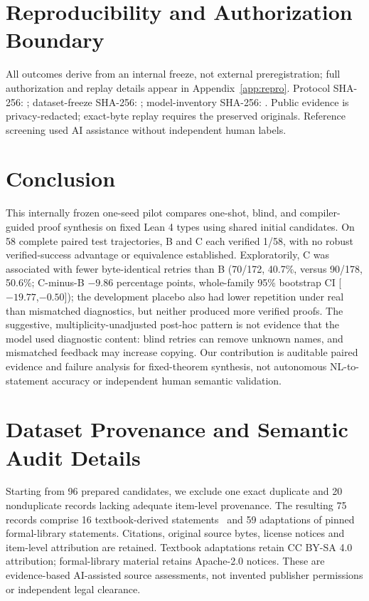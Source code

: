 \documentclass[runningheads,a4paper]{llncs}
\begin{document}
\section{Reproducibility and Authorization Boundary}
All outcomes derive from an internal freeze, not external
preregistration; full authorization and replay details appear
in Appendix~\ref{app:repro}. Protocol SHA-256:
;
dataset-freeze SHA-256:
;
model-inventory SHA-256:
.
Public evidence is privacy-redacted; exact-byte replay requires the
preserved originals. Reference screening used AI assistance without
independent human labels.

\section{Conclusion}
This internally frozen one-seed pilot compares one-shot, blind, and
compiler-guided proof synthesis on fixed Lean 4 types using shared
initial candidates. On 58 complete paired test trajectories, B and
C each verified 1/58, with no robust verified-success advantage
or equivalence established. Exploratorily, C was associated with
fewer byte-identical retries than B (70/172, 40.7\%, versus 90/178,
50.6\%; C-minus-B $-9.86$ percentage points, whole-family
95\% bootstrap CI [$-19.77$,$-0.50$]); the development placebo
also had lower repetition under real than mismatched diagnostics,
but neither produced more verified proofs. The suggestive,
multiplicity-unadjusted post-hoc pattern is not evidence that
the model used diagnostic content: blind retries can remove unknown
names, and mismatched feedback may increase copying. Our contribution
is auditable paired evidence and failure analysis for fixed-theorem
synthesis, not autonomous NL-to-statement accuracy or independent
human semantic validation.

\appendix
\section{Dataset Provenance and Semantic Audit Details}
\label{app:dataset}
Starting from 96 prepared candidates, we exclude one exact duplicate and 20
nonduplicate records lacking adequate item-level provenance. The resulting 75
records comprise 16 textbook-derived statements~\cite{levin2021dmoi} and 59
adaptations of pinned formal-library statements. Citations, original source
bytes, license notices and item-level attribution are retained. Textbook
adaptations retain CC BY-SA 4.0 attribution; formal-library material retains
Apache-2.0 notices. These are evidence-based AI-assisted source assessments,
not invented publisher permissions or independent legal clearance.
\end{document}
